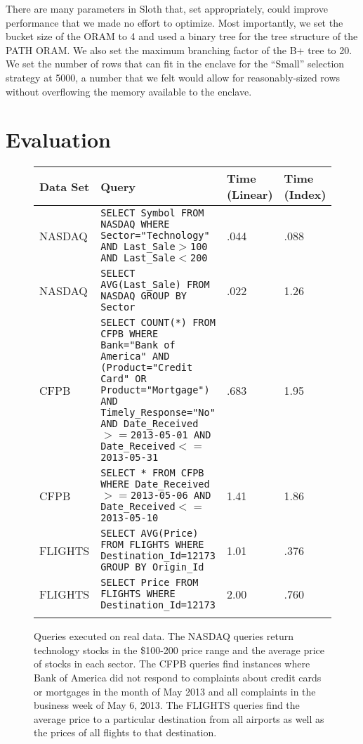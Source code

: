 \documentclass[USenglish,oneside,twocolumn]{article}
\def\name/{Sloth}
\begin{document}
There are many parameters in \name/ that, set appropriately, could improve performance that we made no effort to optimize. Most importantly, we set the bucket size of the ORAM to 4 and used a binary tree for the tree structure of the PATH ORAM. We also set the maximum branching factor of the B+ tree to 20. We set the number of rows that can fit in the enclave for the ``Small'' selection strategy at 5000, a number that we felt would allow for reasonably-sized rows without overflowing the memory available to the enclave. 

\section{Evaluation}\label{eval}
\begin{figure*}
\begin{tabular}{l p{7cm} l l}
 \textbf{Data Set}& \textbf{Query}& \textbf{Time (Linear)} & \textbf{Time (Index)}\\ \hline\rule{0pt}{3ex}
NASDAQ & \texttt{SELECT Symbol FROM NASDAQ WHERE Sector="Technology" AND Last\_Sale$>$100 AND Last\_Sale$<$200} & .044 & .088\\ \rule{0pt}{3ex}
NASDAQ & \texttt{SELECT AVG(Last\_Sale) FROM NASDAQ GROUP BY Sector}& .022 & 1.26\\\rule{0pt}{3ex}
CFPB & \texttt{SELECT COUNT(*) FROM CFPB WHERE Bank="Bank of America" AND (Product="Credit Card" OR Product="Mortgage") AND Timely\_Response="No" AND Date\_Received$>=$2013-05-01 AND Date\_Received$<=$2013-05-31 }& .683 & 1.95\\\rule{0pt}{3ex}
CFPB & \texttt{SELECT * FROM CFPB WHERE Date\_Received$>=$2013-05-06 AND Date\_Received$<=$2013-05-10 } & 1.41 & 1.86\\\rule{0pt}{3ex} 
FLIGHTS & \texttt{SELECT AVG(Price) FROM FLIGHTS WHERE Destination\_Id=12173 GROUP BY Origin\_Id}& 1.01 & .376\\\rule{0pt}{3ex}
FLIGHTS &\texttt{SELECT Price FROM FLIGHTS WHERE Destination\_Id=12173} & 2.00 & .760\\\rule{0pt}{3ex}
\end{tabular}
\caption{Queries executed on real data. The NASDAQ queries return technology stocks in the \$100-200 price range and the average price of stocks in each sector. The CFPB queries find instances where Bank of America did not respond to complaints about credit cards or mortgages in the month of May 2013 and all complaints in the business week of May 6, 2013. The FLIGHTS queries find the average price to a particular destination from all airports as well as the prices of all flights to that destination.}
\label{figQueries}
\end{figure*}
\end{document}
